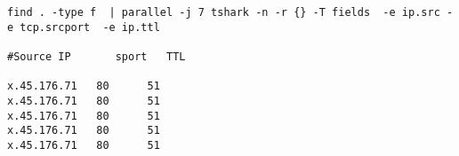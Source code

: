 
\begin{lstlisting}
find . -type f  | parallel -j 7 tshark -n -r {} -T fields  -e ip.src -e tcp.srcport  -e ip.ttl

#Source IP       sport   TTL

x.45.176.71   80      51
x.45.176.71   80      51
x.45.176.71   80      51
x.45.176.71   80      51
x.45.176.71   80      51

\end{lstlisting}
